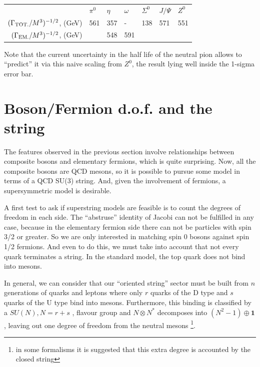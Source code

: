 \documentclass[a4paper,10pt]{article}
\begin{document}
\begin{center}
\begin{tabular}{r|llllll}
 & $\pi^0$ & $\eta$ & $\omega$ & $\Sigma^0$ & $J/\Psi$ & $Z^0$ \\ 
$(\Gamma_{\mbox{\begin{scriptsize}TOT.\end{scriptsize}}}/M^3)^{-1/2}$, (GeV) & 561 & 357 & - & 138 & 571 & 551 \\
$(\Gamma_{\mbox{\begin{scriptsize}EM.\end{scriptsize}}}/M^3)^{-1/2}$, (GeV)&         &   548 &591     &            &          &      
\end{tabular}
\end{center}

Note that the current uncertainty in the half life of the neutral pion allows to ``predict'' it via this naive scaling from $Z^0$, the result lying well inside the 1-sigma error bar. 

\section{Boson/Fermion d.o.f. and the string}

The features observed in the previous section involve relationships between composite bosons and elementary fermions, which is quite surprising. Now, all the composite bosons are QCD mesons, so it is possible to pursue some model in terms of a QCD SU(3) string. And, given the involvement of fermions, a supersymmetric model is desirable.

A first test to ask if superstring models are feasible is to count the degrees of freedom in each side.  The ``abstruse'' identity of Jacobi can not be fulfilled in any case, because in the elementary fermion side there can not be particles with spin 3/2 or greater. So we are only interested in matching spin 0 bosons against spin 1/2 fermions. And even to do this, we must take into account that not every quark terminates a string. In the standard model, the top quark does not bind into mesons.

In general, we can consider that our ``oriented string'' sector must be built from $n$ generations of quarks and leptons where only $r$ quarks of the D type and $s$ quarks of the U type bind into mesons. Furthermore, this binding is classified by a $SU(N), N=r+s$ , flavour group  and $N \otimes N^*$ decomposes into $(N^2-1) \oplus \mathbf{1}$, leaving out one degree of freedom from the neutral mesons \footnote{in some formalisms it is suggested that this extra degree is accounted by the closed string}.
\end{document}
